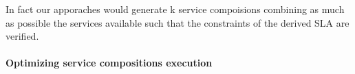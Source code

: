   In fact our apporaches would generate k service compoisions combining as much as possible the services available such that the constraints of the derived SLA are verified. 
 
   \paragraph{Optimizing service compositions execution}
